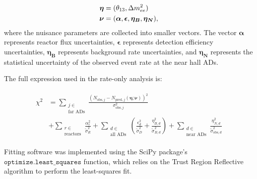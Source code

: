 \begin{align}
    \begin{split}
        \boldsymbol{\eta} &= (\theta_{13}, \Delta m^2_{ee}) \\
        \boldsymbol{\nu} &= (
            \boldsymbol{\alpha},
            \boldsymbol{\epsilon},
            \boldsymbol{\eta_B},
            \boldsymbol{\eta_N}),
    \end{split}
\end{align}
where the nuisance parameters are collected into smaller vectors.
The vector $\boldsymbol{\alpha}$ represents reactor flux uncertainties,
$\boldsymbol{\epsilon}$ represents detection efficiency uncertainties,
$\boldsymbol{\eta_B}$ represents background rate uncertainties,
and $\boldsymbol{\eta_N}$ represents the statistical uncertainty
of the observed event rate at the near hall ADs.

The full \chisquare{} expression used in the rate-only analysis is:

\begin{align}
    \begin{split}
        \chi^2 &= \sum_{\substack{j \in \\\text{far ADs}}}
            \frac{
                (N_{\text{obs},j}
                - N_{\text{pred},j}(\boldsymbol{\eta};\boldsymbol{\nu}))^2}
            {\sigma_{\text{obs},j}^2 } \\
            &+ \sum_{\substack{r \in \\\text{reactors}}}
                \frac{\alpha_r^2}{\tilde{\sigma}_R^2}
            + \sum_{\substack{d \in \\\text{all ADs}}}
            \left(
                \frac{\epsilon_d^2}{\tilde{\sigma}_D^2}
                + \frac{\eta_{B,d}^2}{\tilde{\sigma}_{B,d}^2}
            \right)
            + \sum_{\substack{d \in \\\text{near ADs}}}
            \frac{\eta_{N,d}^2}{\tilde{\sigma}^2_{\text{obs},d}}
    \end{split}
\end{align}

Fitting software was implemented using the SciPy package's
$\mathtt{optimize.least\_squares}$ function,
which relies on the Trust Region Reflective algorithm 
to perform the least-squares fit.




